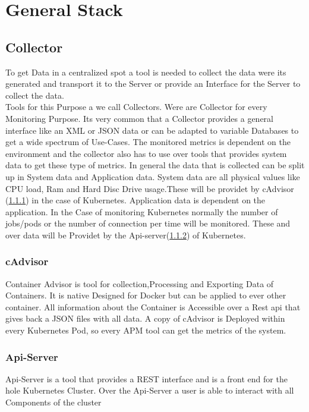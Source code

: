  
\chapter{General Stack}
\label{chap:ch2}
\section{Collector}
To get Data in a centralized spot a tool is needed to collect the data were its generated and transport it to the Server or provide an Interface for the Server to collect the data.\\
Tools for this Purpose a we call Collectors. Were are Collector for every Monitoring Purpose. Its very common that a Collector provides a general interface like an XML or JSON data or can be adapted to variable Databases to get a wide spectrum of Use-Cases. The monitored metrics is dependent on the environment and the collector also has to use over tools that provides system data to get these type of metrics. In general the data that is collected can be split up in System data and Application data. System data are all physical values like CPU load, Ram and Hard Disc Drive usage.These will be providet by cAdvisor (\ref{cadvisor}) in the case of Kubernetes. Application data is dependent on the application. In the Case of monitoring Kubernetes normally the number of jobs/pods or the number of connection per time will be monitored. These and over data will be Providet by the Api-server(\ref{apiserver}) of Kubernetes.
\subsection{cAdvisor}
\label{cadvisor}
Container Advisor is tool for collection,Processing and Exporting Data of Containers. It is native Designed for Docker but can be applied to ever other container. All information about the Container is Accessible over a Rest api that gives back a JSON files with all data. A copy of cAdvisor is Deployed within every Kubernetes Pod, so every APM tool can get the metrics of the system.
\subsection{Api-Server}
\label{apiserver} 
Api-Server is a tool that provides a REST interface and is a front end for the hole Kubernetes Cluster. Over the Api-Server a user is able to interact with all Components of the cluster  

